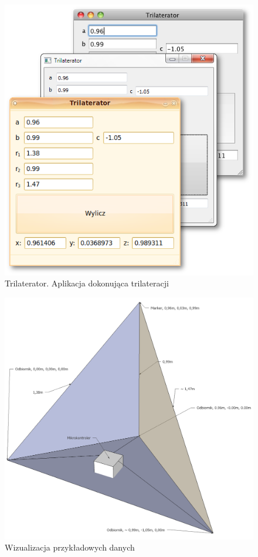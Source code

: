 \begin{figure}
 \includegraphics[width=\textwidth]{gfx/trilaterator_triple.png}
 \caption{Trilaterator. Aplikacja dokonująca trilateracji}
 \label{fig:trilaterator}
\end{figure}

\begin{figure}
  \includegraphics[width=\textwidth]{gfx/wizualizacja_3d.png}
  \caption{Wizualizacja przykładowych danych}
  \label{fig:trilateration_sample}
\end{figure}

